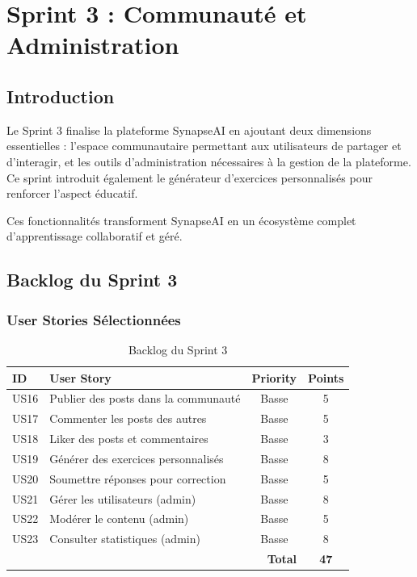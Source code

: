 
\chapter{Sprint 3 : Communauté et Administration}
\label{chap:sprint3}

\section{Introduction}

Le Sprint 3 finalise la plateforme SynapseAI en ajoutant deux dimensions essentielles : l'espace communautaire permettant aux utilisateurs de partager et d'interagir, et les outils d'administration nécessaires à la gestion de la plateforme. Ce sprint introduit également le générateur d'exercices personnalisés pour renforcer l'aspect éducatif.

Ces fonctionnalités transforment SynapseAI en un écosystème complet d'apprentissage collaboratif et géré.

\section{Backlog du Sprint 3}

\subsection{User Stories Sélectionnées}

\begin{table}[H]
\centering
\caption{Backlog du Sprint 3}
\label{tab:backlog-sprint3}
\begin{tabular}{|l|p{7cm}|c|c|}
\hline
\textbf{ID} & \textbf{User Story} & \textbf{Priority} & \textbf{Points} \\
\hline
US16 & Publier des posts dans la communauté & Basse & 5 \\
\hline
US17 & Commenter les posts des autres & Basse & 5 \\
\hline
US18 & Liker des posts et commentaires & Basse & 3 \\
\hline
US19 & Générer des exercices personnalisés & Basse & 8 \\
\hline
US20 & Soumettre réponses pour correction & Basse & 5 \\
\hline
US21 & Gérer les utilisateurs (admin) & Basse & 8 \\
\hline
US22 & Modérer le contenu (admin) & Basse & 5 \\
\hline
US23 & Consulter statistiques (admin) & Basse & 8 \\
\hline
\multicolumn{3}{|r|}{\textbf{Total}} & \textbf{47} \\
\hline
\end{tabular}
\end{table}

